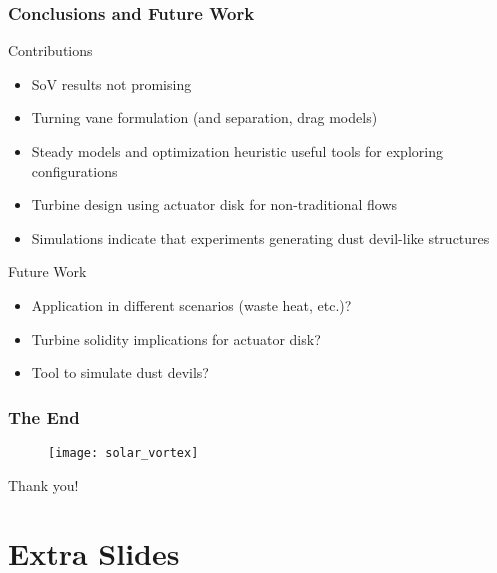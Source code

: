 \documentclass[mathserif]{beamer}
\begin{document}
%
%
\begin{frame}
 \frametitle{Conclusions and Future Work}

 \begin{block}{Contributions}
  \begin{itemize}
  \item SoV results not promising
  \item Turning vane formulation (and separation, drag models)
  \item Steady models and optimization heuristic useful tools for exploring configurations
  \item Turbine design using actuator disk for non-traditional flows
  \item Simulations indicate that experiments generating dust devil-like structures
  \end{itemize}
 \end{block}


 \begin{block}{Future Work}
  \begin{itemize}
  \item Application in different scenarios (waste heat, etc.)?
  \item Turbine solidity implications for actuator disk?
  \item Tool to simulate dust devils?
  \end{itemize}
 \end{block}
 


\end{frame}

%
%
%
 \begin{frame}
   \frametitle{The End}

   \begin{figure}[htb]
     \centering
     \texttt{[image: solar\_vortex]}
   \end{figure}

   \begin{block}{Thank you!}
    \end{block}
 \end{frame}


%
\appendix
\section{Extra Slides}
\end{document}
